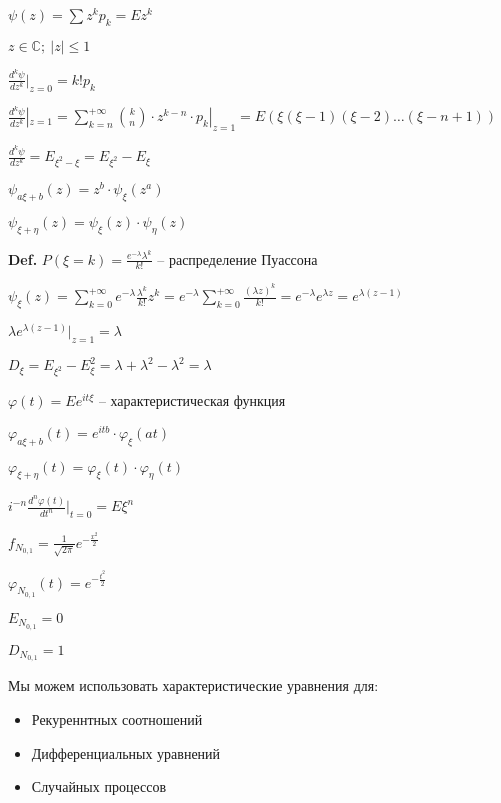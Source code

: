 \documentclass[14pt, letter paper]{article}
\begin{document}
$\psi(z) = \sum z^kp_k = E z^k$

$z \in \mathds{C};\ |z| \leq 1$

$\frac{d^k\psi}{dz^k}|_{z=0} = k!p_k$

$\frac{d^k\psi}{dz^k}|_{z=1} = \sum\limits_{k = n}^{+ \infty} {k \choose n} \cdot z^{k-n} \cdot p_k |_{z = 1} = E(\xi(\xi - 1)(\xi - 2) \ldots (\xi - n + 1))$

$\frac{d^k\psi}{dz^k} = E_{\xi^2 - \xi} = E_{\xi^2} - E_\xi$

$\psi_{a\xi + b}(z) = z^b \cdot \psi_{\xi}(z^a)$

$\psi_{\xi + \eta}(z) = \psi_\xi(z) \cdot \psi_\eta(z)$

\textbf{Def.} $P(\xi = k) = \frac{e^{-\lambda}\lambda^k}{k!}$ -- распределение Пуассона

$\psi_\xi(z) = \sum\limits_{k=0}^{+\infty} e^{-\lambda} \frac{\lambda^k}{k!}z^k = e^{-\lambda} \sum\limits_{k=0}^{+\infty} \frac{(\lambda z)^k}{k!} = e^{-\lambda}e^{\lambda z} = e^{\lambda(z-1)}$

$\lambda e^{\lambda(z-1)}|_{z=1} = \lambda$

$D_\xi = E_{\xi^2} - E_\xi^2 = \lambda + \lambda^2 - \lambda^2 = \lambda$

$\varphi(t) = Ee^{it\xi}$ -- характеристическая функция

$\varphi_{a\xi + b}(t) = e^{itb} \cdot \varphi_\xi(at)$

$\varphi_{\xi + \eta}(t) = \varphi_\xi(t) \cdot \varphi_\eta(t)$

$i^{-n}\frac{d^n\varphi(t)}{dt^n}|_{t=0} = E\xi^n$

$f_{N_{0, 1}} = \frac{1}{\sqrt{2\pi}}e^{-\frac{x^2}{2}}$

$\varphi_{N_{0, 1}}(t) = e^{-\frac{t^2}{2}}$

$E_{N_{0, 1}} = 0$

$D_{N_{0, 1}} = 1$

\vspace{5mm}

Мы можем использовать характеристические уравнения для:

\begin{itemize}
    \item Рекуреннтных соотношений
    \item Дифференциальных уравнений
    \item Случайных процессов
\end{itemize}

\vspace{5mm}
\end{document}
